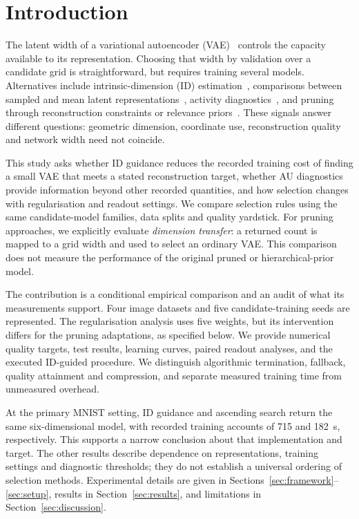 \section{Introduction}\label{sec:intro}

The latent width of a variational autoencoder (VAE)~\cite{kingma2014vae}
controls the capacity available to its representation. Choosing that width
by validation over a candidate grid is straightforward, but requires
training several models. Alternatives include intrinsic-dimension (ID)
estimation~\cite{facco2017twonn,levina2005mle}, comparisons between sampled
and mean latent representations~\cite{bonheme2022fondue}, activity
diagnostics~\cite{burda2016iwae,bonheme2023active}, and pruning through
reconstruction constraints or relevance priors~\cite{deboom2020geco,saha2025ardvae}.
These signals answer different questions: geometric dimension, coordinate
use, reconstruction quality and network width need not coincide.

This study asks whether ID guidance reduces the recorded training cost of
finding a small VAE that meets a stated reconstruction target, whether AU
diagnostics provide information beyond other recorded quantities, and how
selection changes with regularisation and readout settings. We compare
selection rules using the same candidate-model families, data splits and
quality yardstick. For pruning approaches, we explicitly evaluate
\emph{dimension transfer}: a returned count is mapped to a grid width and
used to select an ordinary VAE. This comparison does not measure the
performance of the original pruned or hierarchical-prior model.

The contribution is a conditional empirical comparison and an audit of
what its measurements support. Four image datasets and five
candidate-training seeds are represented. The regularisation analysis
uses five weights, but its intervention differs for the pruning
adaptations, as specified below. We provide numerical quality targets,
test results, learning curves, paired readout analyses, and the executed
ID-guided procedure. We distinguish algorithmic termination, fallback,
quality attainment and compression, and separate measured training time
from unmeasured overhead.

At the primary MNIST setting, ID guidance and ascending search return the
same six-dimensional model, with recorded training accounts of 715 and
182~s, respectively. This supports a narrow conclusion about that
implementation and target. The other results describe dependence on
representations, training settings and diagnostic thresholds; they do not
establish a universal ordering of selection methods. Experimental details
are given in Sections~\ref{sec:framework}--\ref{sec:setup}, results in
Section~\ref{sec:results}, and limitations in Section~\ref{sec:discussion}.

